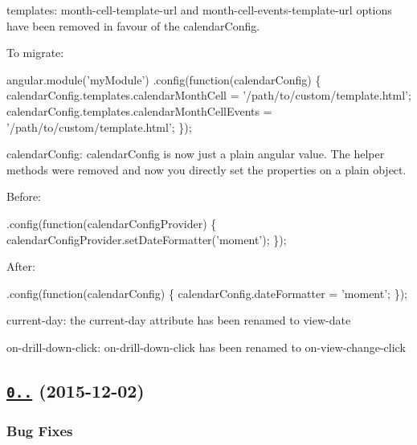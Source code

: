 \begin{DoxyItemize}
\item templates\+: {\ttfamily month-\/cell-\/template-\/url} and {\ttfamily month-\/cell-\/events-\/template-\/url} options have been removed in favour of the calendar\+Config.
\end{DoxyItemize}

To migrate\+:


\begin{DoxyCode}
angular.module('myModule')
  .config(function(calendarConfig) \{
    calendarConfig.templates.calendarMonthCell = '/path/to/custom/template.html';
    calendarConfig.templates.calendarMonthCellEvents = '/path/to/custom/template.html';
  \});
\end{DoxyCode}

\begin{DoxyItemize}
\item calendar\+Config\+: {\ttfamily calendar\+Config} is now just a plain angular value. The helper methods were removed and now you directly set the properties on a plain object.
\end{DoxyItemize}

Before\+: 
\begin{DoxyCode}
.config(function(calendarConfigProvider) \{
  calendarConfigProvider.setDateFormatter('moment');
\});
\end{DoxyCode}


After\+: 
\begin{DoxyCode}
.config(function(calendarConfig) \{
  calendarConfig.dateFormatter = 'moment';
\});
\end{DoxyCode}



\begin{DoxyItemize}
\item current-\/day\+: the {\ttfamily current-\/day} attribute has been renamed to {\ttfamily view-\/date}
\item on-\/drill-\/down-\/click\+: {\ttfamily on-\/drill-\/down-\/click} has been renamed to {\ttfamily on-\/view-\/change-\/click}
\end{DoxyItemize}

\label{_0.17.6}%
 \subsection*{\href{https://github.com/mattlewis92/angular-bootstrap-calendar/compare/0.17.5...v0.17.6}{\tt 0..} (2015-\/12-\/02)}

\subsubsection*{Bug Fixes}


